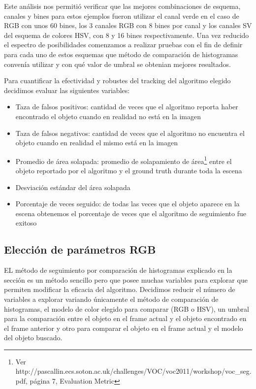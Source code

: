 Este análisis nos permitió verificar que las mejores combinaciones de esquema, canales y bines para estos ejemplos fueron utilizar el canal verde en el caso de RGB con unos 60 bines, los 3 canales RGB con 8 bines por canal y los canales SV del esquema de colores HSV, con 8 y 16 bines respectivamente. Una vez reducido el espectro de posibilidades comenzamos a realizar pruebas con el fin de definir para cada uno de estos esquemas que método de comparación de histogramas convenía utilizar y con qué valor de umbral se obtenian mejores resultados.








Para cuantificar la efectividad y robustes del tracking del algoritmo elegido decidimos evaluar las siguientes variables:
\begin{itemize}
	\item Taza de falsos positivos: cantidad de veces que el algoritmo reporta haber encontrado el objeto cuando en realidad no está en la imagen
	\item Taza de falsos negativos: cantidad de veces que el algoritmo no encuentra el objeto cuando en realidad el mismo está en la imagen
	\item Promedio de área solapada: promedio de solapamiento de área\footnote{Ver http://pascallin.ecs.soton.ac.uk/challenges/VOC/voc2011/workshop/voc\_seg.pdf, página 7, Evaluation Metric} entre el objeto reportado por el algoritmo y el ground truth durante toda la escena
	\item Desviación estándar del área solapada
	\item Porcentaje de veces seguido: de todas las veces que el objeto aparece en la escena obtenemos el porcentaje de veces que el algoritmo de seguimiento fue exitoso	
\end{itemize}

\subsection{Elección de parámetros RGB}
EL método de seguimiento por comparación de histogramas explicado en la sección  es un método sencillo pero que posee muchas variables para explorar que permiten modificar la eficacia del algoritmo. Decidimos reducir el número de variables a explorar variando únicamente el método de comparación de histogramas, el modelo de color elegido para comparar (RGB o HSV), un umbral para la comparación entre el objeto en el frame actual y el objeto encontrado en el frame anterior y otro para comparar el objeto en el frame actual y el modelo del objeto buscado.

